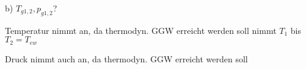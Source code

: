 b) $T_{g1,2}, p_{g1,2}$?

Temperatur nimmt an, da thermodyn. GGW erreicht werden soll nimmt $T_1$ bis $T_2 = T_{ew}$

Druck nimmt auch an, da thermodyn. GGW erreicht werden soll